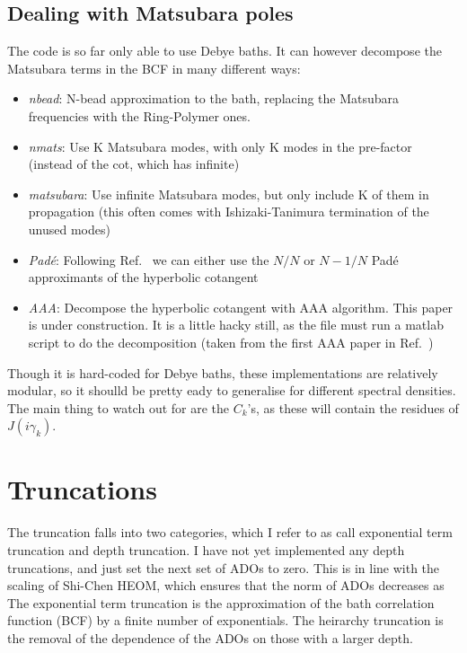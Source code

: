 \documentclass{article}
\begin{document}
\subsection{Dealing with Matsubara poles}
The code is so far only able to use Debye baths. It can however decompose the Matsubara terms in the BCF in many different ways:
\begin{itemize}
    \item \textit{nbead}: N-bead approximation to the bath, replacing the Matsubara frequencies with the Ring-Polymer ones.
    \item \textit{nmats}: Use K Matsubara modes, with only K modes in the pre-factor (instead of the cot, which has infinite)
    \item \textit{matsubara}: Use infinite Matsubara modes, but only include K of them in propagation (this often comes with Ishizaki-Tanimura termination of the unused modes)
    \item \textit{Pad\'e}: Following Ref.~\cite{huPadeSpectrumDecompositions2011a} we can either use the $N/N$ or $N\!-\!1/N$ Pad\'e approximants of the hyperbolic cotangent
    \item \textit{AAA}: Decompose the hyperbolic cotangent with AAA algorithm. This paper is under construction. It is a little hacky still, as the file must run a matlab script to do the decomposition (taken from the first AAA paper in Ref.~\cite{nakatsukasaAAAAlgorithmRational2018})
\end{itemize}
Though it is hard-coded for Debye baths, these implementations are relatively modular, so it shoulld be pretty eady to generalise for different spectral densities. The main thing to watch out for are the $C_k$'s, as these will contain the residues of $J(i\gamma_k)$.
\section{Truncations}
The truncation falls into two categories, which I refer to as call exponential term truncation and depth truncation. I have not yet implemented any depth truncations, and just set the next set of ADOs to zero. This is in line with the scaling of Shi-Chen HEOM, which ensures that the norm of ADOs decreases as 
The exponential term truncation is the approximation of the bath correlation function (BCF) by a finite number of exponentials.
The heirarchy truncation is the removal of the dependence of the ADOs on those with a larger depth.
\end{document}
